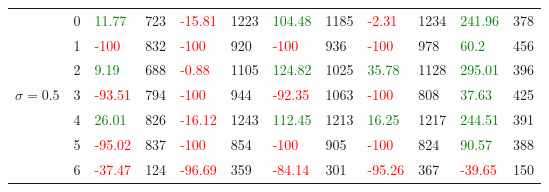 \begin{table}[!htb]
\begin{adjustwidth}{-0.8in}{-0.9in}
\begin{tabular}{|p{4em}|p{2em}|p{3em}|p{3em}|p{3em}|p{3em}|p{3em}|p{3em}|p{3em}|p{3em}|p{3em}|p{3em}|}
            & 0 & \textcolor{green}{11.77} & 723 & \textcolor{red}{-15.81} & 1223 & \textcolor{green}{104.48} & 1185 & \textcolor{red}{-2.31} & 1234 & \textcolor{green}{241.96} & 378\\\cline{3-12}
            & 1 & \textcolor{red}{-100} & 832 & \textcolor{red}{-100} & 920 & \textcolor{red}{-100} & 936 & \textcolor{red}{-100} & 978 & \textcolor{green}{60.2} & 456\\\cline{3-12}
            & 2 & \textcolor{green}{9.19} & 688 & \textcolor{red}{-0.88} & 1105 & \textcolor{green}{124.82} & 1025 & \textcolor{green}{35.78} & 1128 & \textcolor{green}{295.01} & 396\\\cline{3-12}
            $\sigma=0.5$& 3 & \textcolor{red}{-93.51} & 794 & \textcolor{red}{-100} & 944 & \textcolor{red}{-92.35} & 1063 & \textcolor{red}{-100} & 808 & \textcolor{green}{37.63} & 425\\\cline{3-12}
            & 4 & \textcolor{green}{26.01} & 826 & \textcolor{red}{-16.12} & 1243 & \textcolor{green}{112.45} & 1213 & \textcolor{green}{16.25} & 1217 & \textcolor{green}{244.51} & 391\\\cline{3-12}
            & 5 & \textcolor{red}{-95.02} & 837 & \textcolor{red}{-100} & 854 & \textcolor{red}{-100} & 905 & \textcolor{red}{-100} & 824 & \textcolor{green}{90.57} & 388\\\cline{3-12}
            & 6 & \textcolor{red}{-37.47} & 124 & \textcolor{red}{-96.69} & 359 & \textcolor{red}{-84.14} & 301 & \textcolor{red}{-95.26} & 367 & \textcolor{red}{-39.65} & 150\\\hline\hline
            

\end{tabular}
\end{adjustwidth}
\end{table}
